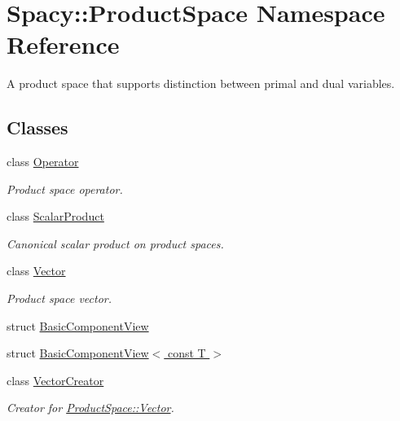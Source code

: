 \hypertarget{namespaceSpacy_1_1ProductSpace}{\section{Spacy\-:\-:Product\-Space Namespace Reference}
\label{namespaceSpacy_1_1ProductSpace}
}


A product space that supports distinction between primal and dual variables.  


\subsection*{Classes}
\begin{DoxyCompactItemize}
\item 
class \hyperlink{classSpacy_1_1ProductSpace_1_1Operator}{Operator}
\begin{DoxyCompactList}\small\item\em Product space operator. \end{DoxyCompactList}\item 
class \hyperlink{classSpacy_1_1ProductSpace_1_1ScalarProduct}{Scalar\-Product}
\begin{DoxyCompactList}\small\item\em Canonical scalar product on product spaces. \end{DoxyCompactList}\item 
class \hyperlink{classSpacy_1_1ProductSpace_1_1Vector}{Vector}
\begin{DoxyCompactList}\small\item\em Product space vector. \end{DoxyCompactList}\item 
struct \hyperlink{structSpacy_1_1ProductSpace_1_1BasicComponentView}{Basic\-Component\-View}
\item 
struct \hyperlink{structSpacy_1_1ProductSpace_1_1BasicComponentView_3_01const_01T_01_4}{Basic\-Component\-View$<$ const T $>$}
\item 
class \hyperlink{classSpacy_1_1ProductSpace_1_1VectorCreator}{Vector\-Creator}
\begin{DoxyCompactList}\small\item\em Creator for \hyperlink{classSpacy_1_1ProductSpace_1_1Vector}{Product\-Space\-::\-Vector}. \end{DoxyCompactList}\end{DoxyCompactItemize}
